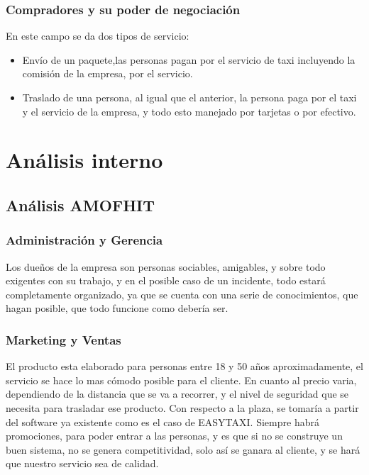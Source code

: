 \subsubsection{Compradores y su poder de negociación}
En este campo se da dos tipos de servicio:
\begin{itemize}
    \item Envío de un paquete,las personas pagan por el servicio de taxi incluyendo la comisión de la empresa, por el servicio.
    \item Traslado de una persona, al igual que el anterior, la persona paga por el taxi y el servicio de la empresa, y todo esto manejado por tarjetas o por efectivo. 
\end{itemize}

\section{Análisis interno}

\subsection{Análisis AMOFHIT}
\subsubsection{Administración y Gerencia}
Los dueños de la empresa son personas sociables, amigables, y sobre todo exigentes con su trabajo, y en el posible caso de un incidente, todo estará completamente organizado, ya que se cuenta con una serie de conocimientos, que hagan posible, que todo funcione como debería ser. 

\subsubsection{Marketing y Ventas}
El producto esta elaborado para personas entre 18 y 50 años aproximadamente, el servicio se hace lo mas cómodo posible para el cliente.
En cuanto al precio varia, dependiendo de la distancia que se va a recorrer, y el nivel de seguridad que se necesita para trasladar ese producto.
Con respecto a la plaza, se tomaría a partir del software ya existente como es el caso de EASYTAXI. Siempre habrá promociones, para poder entrar a las personas, y es que si no se construye un buen sistema, no se genera competitividad, solo así se ganara al cliente, y se hará que nuestro servicio sea de calidad.  
